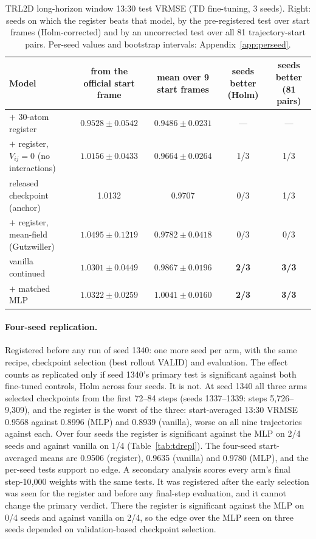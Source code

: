 \documentclass{article}
\newcommand{\TDvanilla}{$1.0301 \pm 0.0449$}
\newcommand{\TDquantum}{$\mathbf{0.9528 \pm 0.0542}$}
\newcommand{\TDmlp}{$1.0322 \pm 0.0259$}
\newcommand{\TDnoent}{$1.0156 \pm 0.0433$}
\newcommand{\TDgutz}{$1.0495 \pm 0.1219$}
\newcommand{\MSquantum}{$\mathbf{0.9486 \pm 0.0231}$}
\newcommand{\MSnoent}{$0.9664 \pm 0.0264$}
\newcommand{\MSgutz}{$0.9782 \pm 0.0418$}
\newcommand{\MSanchor}{0.9707}
\newcommand{\MSvanilla}{$0.9867 \pm 0.0196$}
\newcommand{\MSmlp}{$1.0041 \pm 0.0160$}
\begin{document}
\begin{table}[h]
\centering
\caption{TRL2D long-horizon window 13:30 test VRMSE (TD fine-tuning, 3 seeds). Right: seeds on which the register
beats that model, by the pre-registered test over start frames (Holm-corrected) and by an uncorrected test over
all 81 trajectory-start pairs. Per-seed values and bootstrap intervals: Appendix~\ref{app:perseed}.}
\label{tab:trl2d}
\small
\setlength{\tabcolsep}{4pt}
\begin{tabular}{lcccc}
\toprule
Model & from the official start frame & mean over 9 start frames & seeds better (Holm) & seeds better (81 pairs) \\
\midrule
$+$ 30-atom register & \TDquantum & \MSquantum & --- & --- \\
$+$ register, $V_{ij}{=}0$ (no interactions) & \TDnoent & \MSnoent & 1/3 & 1/3 \\
released checkpoint (anchor) & 1.0132 & \MSanchor & 0/3 & 1/3 \\
$+$ register, mean-field (Gutzwiller) & \TDgutz & \MSgutz & 0/3 & 0/3 \\
vanilla continued & \TDvanilla & \MSvanilla & \textbf{2/3} & \textbf{3/3} \\
$+$ matched MLP & \TDmlp & \MSmlp & \textbf{2/3} & \textbf{3/3} \\
\bottomrule
\end{tabular}
\end{table}

\paragraph{Four-seed replication.} Registered before any run of seed 1340: one more seed per arm, with the same recipe,
checkpoint selection (best rollout VALID) and evaluation. The effect counts as replicated only if seed 1340's primary test
is significant against both fine-tuned controls, Holm across four seeds. It is not. At seed 1340 all three arms selected
checkpoints from the first 72--84 steps (seeds 1337--1339: steps 5,726--9,309), and the register is the worst of the three:
start-averaged 13:30 VRMSE 0.9568 against 0.8996 (MLP) and 0.8939 (vanilla), worse on all nine trajectories against each.
Over four seeds the register is significant against the MLP on 2/4 seeds and against vanilla on 1/4
(Table~\ref{tab:tdrepl}). The four-seed start-averaged means are 0.9506 (register), 0.9635 (vanilla) and 0.9780
(MLP), and the per-seed tests support no edge. A secondary analysis scores every arm's final step-10{,}000 weights with the same tests. It was
registered after the early selection was seen for the register and before any final-step evaluation, and it cannot
change the primary verdict. There the register is significant against the MLP on 0/4 seeds and against vanilla on 2/4,
so the edge over the MLP seen on three seeds depended on validation-based checkpoint selection.
\end{document}
